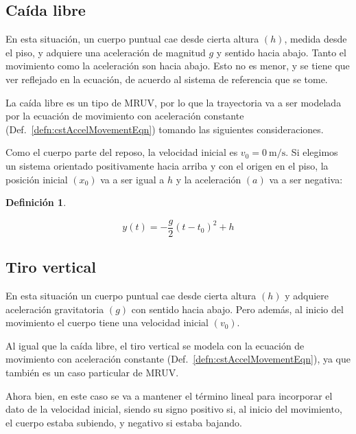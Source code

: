 \documentclass[a5paper,12pt,twoside]{book}
\newtheorem{defn}{{Definición}}[chapter]
\begin{document}
\subsection{Caída libre}

En esta situación, un cuerpo puntual cae desde cierta altura $(h)$, medida desde el piso, y adquiere una aceleración de magnitud $g$ y sentido hacia abajo. Tanto el movimiento como la aceleración son hacia abajo. Esto no es menor, y se tiene que ver reflejado en la ecuación, de acuerdo al sistema de referencia que se tome.

La caída libre es un tipo de MRUV, por lo que la trayectoria va a ser modelada por la ecuación de movimiento con aceleración constante (Def.\ \ref{defn:cstAccelMovementEqn}) tomando las siguientes consideraciones.

Como el cuerpo parte del reposo, la velocidad inicial es $v_0 = \SI{0}{\metre/\second}$. Si elegimos un sistema orientado positivamente hacia arriba y con el origen en el piso, la posición inicial $\left( x_0 \right)$ va a ser igual a $h$ y la aceleración $(a)$ va a ser negativa:

\begin{mdframed}[style=MyFrame1]
    \begin{defn}
    \end{defn}
    \begin{equation*}
        y(t) = -\frac{g}{2} \left(t-t_0\right)^2 + h
    \end{equation*}
\end{mdframed}


\subsection{Tiro vertical}

En esta situación un cuerpo puntual cae desde cierta altura $(h)$ y adquiere aceleración gravitatoria $(g)$ con sentido hacia abajo. Pero además, al inicio del movimiento el cuerpo tiene una velocidad inicial $(v_0)$.

Al igual que la caída libre, el tiro vertical se modela con la ecuación de movimiento con aceleración constante (Def.\ \ref{defn:cstAccelMovementEqn}), ya que también es un caso particular de MRUV.

Ahora bien, en este caso se va a mantener el término lineal para incorporar el dato de la velocidad inicial, siendo su signo positivo si, al inicio del movimiento, el cuerpo estaba subiendo, y negativo si estaba bajando.
\end{document}
